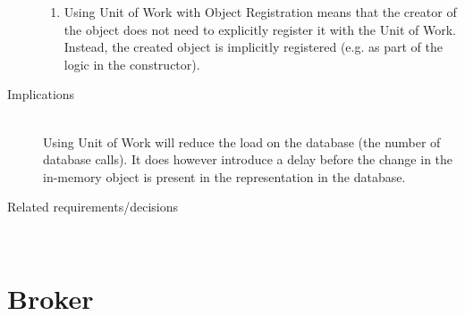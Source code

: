 \begin{description}
\begin{enumerate}
\item Using Unit of Work with Object Registration means that the creator of the object does not need to explicitly register it with the Unit of Work. Instead, the created object is implicitly registered (e.g. as part of the logic in the constructor). 
\end{enumerate}


\item [Implications]~\\
Using Unit of Work will reduce the load on the database (the number of database calls). It does however introduce a delay before the change in the in-memory object is present in the representation in the database.

\item [Related requirements/decisions]~\\


\end{description}

\section{Broker}

